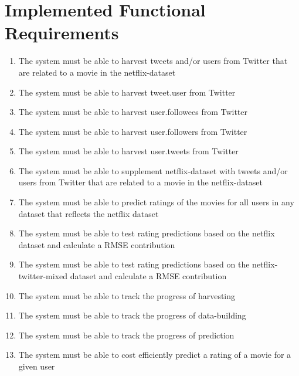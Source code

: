 \section{Implemented Functional Requirements}
\begin{enumerate}[label=\bfseries FR \arabic*:]
  \item {\color{OliveGreen}The system must be able to harvest tweets and/or users from Twitter that are related to a movie in the netflix-dataset}
  \item {\color{OliveGreen}The system must be able to harvest tweet.user from Twitter}
  \item {\color{OliveGreen}The system must be able to harvest user.followees from Twitter}
  \item {\color{RedOrange}The system must be able to harvest user.followers from Twitter}
  \item {\color{OliveGreen}The system must be able to harvest user.tweets from Twitter}
  \item {\color{RedOrange}The system must be able to supplement netflix-dataset with tweets and/or users from Twitter that are related to a movie in the netflix-dataset}
  \item {\color{RedOrange}The system must be able to predict ratings of the movies for all users in any dataset that reflects the netflix dataset}
  \item {\color{RedOrange}The system must be able to test rating predictions based on the netflix dataset and calculate a RMSE contribution}
  \item {\color{RedOrange}The system must be able to test rating predictions based on the netflix-twitter-mixed dataset and calculate a RMSE contribution}
  \item {\color{RedOrange}The system must be able to track the progress of harvesting}
  \item {\color{RedOrange}The system must be able to track the progress of data-building}
  \item {\color{RedOrange}The system must be able to track the progress of prediction}
  \item {\color{RedOrange}The system must be able to cost efficiently predict a rating of a movie for a given user}
\end{enumerate}

